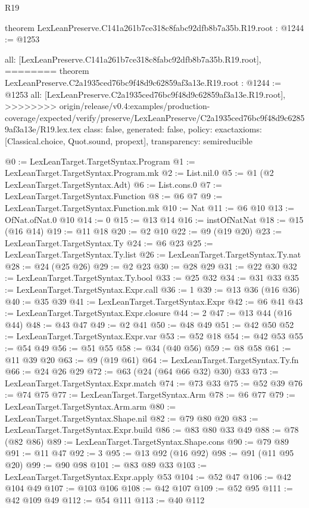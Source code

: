 \begin{lexlean}{R19}
\begin{coremodule}
{{{{{{{{{{{{{theorem LexLeanPreserve.C141a261b7ce318c8fabc92dfb8b7a35b.R19.root : @1244 := @1253 {
  all: [LexLeanPreserve.C141a261b7ce318c8fabc92dfb8b7a35b.R19.root],
========
theorem LexLeanPreserve.C2a1935ced76bc9f48d9c62859af3a13e.R19.root : @1244 := @1253 {
  all: [LexLeanPreserve.C2a1935ced76bc9f48d9c62859af3a13e.R19.root],
>>>>>>>> origin/release/v0.4:examples/production-coverage/expected/verify/preserve/LexLeanPreserve/C2a1935ced76bc9f48d9c62859af3a13e/R19.lex.tex
  class: false,
  generated: false,
  policy: exact{axioms: [Classical.choice, Quot.sound, propext]},
  transparency: semireducible
}

@0 := LexLeanTarget.TargetSyntax.Program
@1 := LexLeanTarget.TargetSyntax.Program.mk
@2 := List.nil.{0}
@5 := @1 (@2 LexLeanTarget.TargetSyntax.Adt)
@6 := List.cons.{0}
@7 := LexLeanTarget.TargetSyntax.Function
@8 := @6 @7
@9 := LexLeanTarget.TargetSyntax.Function.mk
@10 := Nat
@11 := @6 @10
@13 := OfNat.ofNat.{0} @10
@14 := 0
@15 := @13 @14
@16 := instOfNatNat
@18 := @15 (@16 @14)
@19 := @11 @18
@20 := @2 @10
@22 := @9 (@19 @20)
@23 := LexLeanTarget.TargetSyntax.Ty
@24 := @6 @23
@25 := LexLeanTarget.TargetSyntax.Ty.list
@26 := LexLeanTarget.TargetSyntax.Ty.nat
@28 := @24 (@25 @26)
@29 := @2 @23
@30 := @28 @29
@31 := @22 @30
@32 := LexLeanTarget.TargetSyntax.Ty.bool
@33 := @25 @32
@34 := @31 @33
@35 := LexLeanTarget.TargetSyntax.Expr.call
@36 := 1
@39 := @13 @36 (@16 @36)
@40 := @35 @39
@41 := LexLeanTarget.TargetSyntax.Expr
@42 := @6 @41
@43 := LexLeanTarget.TargetSyntax.Expr.closure
@44 := 2
@47 := @13 @44 (@16 @44)
@48 := @43 @47
@49 := @2 @41
@50 := @48 @49
@51 := @42 @50
@52 := LexLeanTarget.TargetSyntax.Expr.var
@53 := @52 @18
@54 := @42 @53
@55 := @54 @49
@56 := @51 @55
@58 := @34 (@40 @56)
@59 := @8 @58
@61 := @11 @39 @20
@63 := @9 (@19 @61)
@64 := LexLeanTarget.TargetSyntax.Ty.fn
@66 := @24 @26 @29
@72 := @63 (@24 (@64 @66 @32) @30) @33
@73 := LexLeanTarget.TargetSyntax.Expr.match
@74 := @73 @33
@75 := @52 @39
@76 := @74 @75
@77 := LexLeanTarget.TargetSyntax.Arm
@78 := @6 @77
@79 := LexLeanTarget.TargetSyntax.Arm.arm
@80 := LexLeanTarget.TargetSyntax.Shape.nil
@82 := @79 @80 @20
@83 := LexLeanTarget.TargetSyntax.Expr.build
@86 := @83 @80 @33 @49
@88 := @78 (@82 @86)
@89 := LexLeanTarget.TargetSyntax.Shape.cons
@90 := @79 @89
@91 := @11 @47
@92 := 3
@95 := @13 @92 (@16 @92)
@98 := @91 (@11 @95 @20)
@99 := @90 @98
@101 := @83 @89 @33
@103 := LexLeanTarget.TargetSyntax.Expr.apply @53
@104 := @52 @47
@106 := @42 @104 @49
@107 := @103 @106
@108 := @42 @107
@109 := @52 @95
@111 := @42 @109 @49
@112 := @54 @111
@113 := @40 @112
}}}}}}}}}}}}}}
\end{coremodule}
\end{lexlean}
